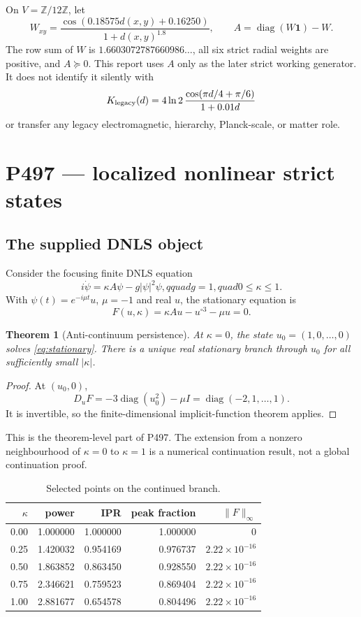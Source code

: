 \documentclass[11pt,a4paper]{article}
\newtheorem{theorem}{Theorem}[section]
\theoremstyle{definition}
\theoremstyle{remark}
\newcommand{\Z}{\mathbb Z}
\newcommand{\one}{\bm 1}
\begin{document}
On $V=\Z/12\Z$, let
\[
 W_{xy}=\frac{\cos(0.18575d(x,y)+0.16250)}{1+d(x,y)^{1.8}},\qquad
 A=\operatorname{diag}(W\one)-W.
\]
The row sum of $W$ is $1.6603072787660986\ldots$, all six strict radial weights are positive, and $A\succeq0$. This report uses $A$ only as the later strict working generator. It does not identify it silently with
\[
 K_{\rm legacy}(d)=4\ln2\,\frac{\cos(\pi d/4+\pi/6)}{1+0.01d}
\]
or transfer any legacy electromagnetic, hierarchy, Planck-scale, or matter role.

\section{P497 --- localized nonlinear strict states}

\subsection{The supplied DNLS object}

Consider the focusing finite DNLS equation
\begin{equation}
 i\dot\psi=\kappa A\psi-g|\psi|^2\psi,qquad g=1,quad 0\le\kappa\le1.
 \label{eq:dnls}
\end{equation}
With $\psi(t)=e^{-i\mu t}u$, $\mu=-1$ and real $u$, the stationary equation is
\begin{equation}
 F(u,\kappa)=\kappa Au-u^{\circ3}-\mu u=0.
 \label{eq:stationary}
\end{equation}

\begin{theorem}[Anti-continuum persistence]
At $\kappa=0$, the state $u_0=(1,0,\ldots,0)$ solves \eqref{eq:stationary}. There is a unique real stationary branch through $u_0$ for all sufficiently small $|\kappa|$.
\end{theorem}
\begin{proof}
At $(u_0,0)$,
\[
 D_uF=-3\operatorname{diag}(u_0^2)-\mu I
      =\operatorname{diag}(-2,1,\ldots,1).
\]
It is invertible, so the finite-dimensional implicit-function theorem applies.
\end{proof}

This is the theorem-level part of P497. The extension from a nonzero neighbourhood of $\kappa=0$ to $\kappa=1$ is a numerical continuation result, not a global continuation proof.

\begin{table}[H]
\centering
\caption{Selected points on the continued branch.}
\begin{tabular}{@{}rrrrr@{}}
\toprule
$\kappa$ & power & IPR & peak fraction & $\|F\|_\infty$\\
\midrule
0.00 & 1.000000 & 1.000000 & 1.000000 & 0\\
0.25 & 1.420032 & 0.954169 & 0.976737 & $2.22\times10^{-16}$\\
0.50 & 1.863852 & 0.863450 & 0.928550 & $2.22\times10^{-16}$\\
0.75 & 2.346621 & 0.759523 & 0.869404 & $2.22\times10^{-16}$\\
1.00 & 2.881677 & 0.654578 & 0.804496 & $2.22\times10^{-16}$\\
\bottomrule
\end{tabular}
\end{table}
\end{document}
